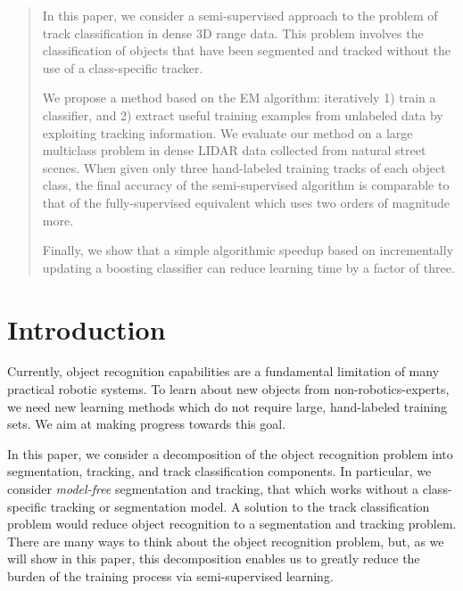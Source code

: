 \documentclass[conference]{IEEEtran}
\begin{document}
\maketitle

\begin{abstract}
  
In this paper, we consider a semi-supervised approach to the problem of track classification in dense 3D range data.  This problem involves the classification of objects that have been segmented and tracked without the use of a class-specific tracker.

We propose a method based on the EM algorithm: iteratively 1) train a classifier, and 2) extract useful training examples from unlabeled data by exploiting tracking information.  We evaluate our method on a large multiclass problem in dense LIDAR data collected from natural street scenes.  When given only three hand-labeled training tracks of each object class, the final accuracy of the semi-supervised algorithm is comparable to that of the fully-supervised equivalent which uses two orders of magnitude more.

Finally, we show that a simple algorithmic speedup based on incrementally updating a boosting classifier can reduce learning time by a factor of three.

\end{abstract}

\IEEEpeerreviewmaketitle

\section{Introduction}

Currently, object recognition capabilities are a fundamental limitation of many practical robotic systems.  To learn about new objects from non-robotics-experts, we need new learning methods which do not require large, hand-labeled training sets.  We aim at making progress towards this goal.

In this paper, we consider a decomposition of the object recognition problem into segmentation, tracking, and track classification components.  In particular, we consider \emph{model-free} segmentation and tracking, \ie that which works without a class-specific tracking or segmentation model.  A solution to the track classification problem would reduce object recognition to a segmentation and tracking problem.  There are many ways to think about the object recognition problem, but, as we will show in this paper, this decomposition enables us to greatly reduce the burden of the training process via semi-supervised learning.
\end{document}

